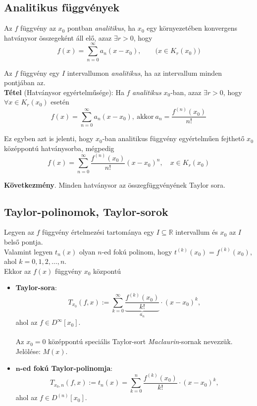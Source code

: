 \documentclass[tikz,12pt,margin=0px]{article}
\newcommand\ddfrac[2]{\frac{\displaystyle #1}{\displaystyle #2}}
\begin{document}
    \subsection*{Analitikus függvények}
	
    \noindent Az $f$ függvény az $x_{0}$ pontban \emph{analitikus}, ha $x_{0}$ egy környezetében konvergens hatványsor összegeként áll elő, azaz $\exists r > 0$, hogy
    \[
        f(x) = \sum\limits_{n=0}^{\infty}a_{n}(x-x_{0}),\qquad \big(x \in K_{r}(x_{0})\big)
    \]

    \noindent Az $f$ függvény egy $I$ intervallumon \emph{analitikus}, ha az intervallum minden pontjában az.\\


    \noindent \textbf{Tétel} (Hatványsor egyértelműsége): Ha $f$ \emph{analitikus} $x_{0}$-ban, azaz $\exists r > 0$, hogy $\forall x \in K_{r}(x_{0})$ esetén
    \[
        f(x) = \sum\limits_{n=0}^{\infty}a_{n}(x-x_{0}),\ \text{akkor}\ a_{n} = \ddfrac{f^{(n)}(x_{0})}{n!}
    \]

    \noindent Ez egyben azt is jelenti, hogy $x_{0}$-ban analitikus függvény egyértelműen fejthető $x_{0}$ középpontú hatványsorba, mégpedig
    \[
        f(x) = \sum\limits_{n=0}^{\infty}\ddfrac{f^{(n)}(x_{0})}{n!}(x - x _{0})^{n},\quad x \in K_{r}(x_{0})
    \]

    \noindent \textbf{Következmény}. Minden hatványsor az összegfüggvényének Taylor sora.

    \subsection*{Taylor-polinomok, Taylor-sorok\\}

    \noindent Legyen az $f$ függvény értelmezési tartománya egy $I \subseteq \mathbb{R}$ intervallum és $x_{0}$ az $I$ belső pontja.\\
    Valamint legyen $t_{n}(x)$ olyan $n$-ed fokú polinom, hogy $t^{(k)}(x_{0}) = f^{(k)}(x_{0})$, ahol $k = 0, 1, 2, \ldots, n$.\\

    \noindent Ekkor az $f(x)$ függvény $x_{0}$ központú
    \begin{itemize}
        \item  \textbf{Taylor-sora}:
        \[
            T_{x_0}(f,x) := \sum\limits_{k=0}^{\infty}\underbrace{\ddfrac{f^{(k)}(x_{0})}{k!}}_{a_n} \cdot (x - x_{0})^{k},
        \]
        ahol az $f \in D^{\infty}[x_0]$.\\ \\
        Az $x_{0} = 0$ középpontú speciális Taylor-sort \emph{Maclaurin}-sornak nevezzük. Jelölése: $M(x)$.
        \item \textbf{$\textbf{n}$-ed fokú Taylor-polinomja}:
        \[
            T_{x_0,n}(f,x) := t_{n}(x) = \sum\limits_{k=0}^{n}\ddfrac{f^{(k)}(x_{0})}{k!} \cdot (x - x_{0})^{k},
        \]
        ahol az $f \in D^{(n)}[x_0]$.
    \end{itemize}
\end{document}
